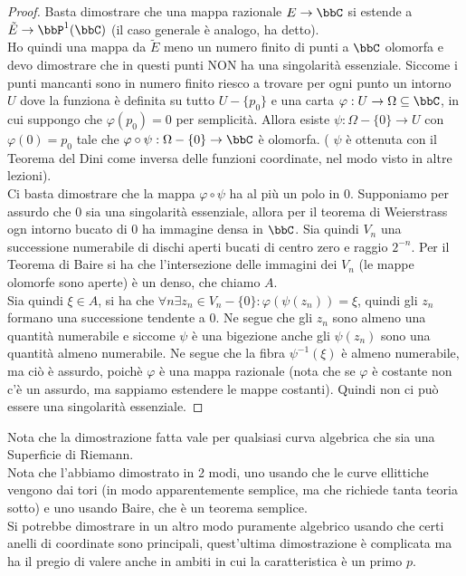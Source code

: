 \begin{proof}
Basta dimostrare che una mappa razionale $E\rightarrow \bbC$ si estende a $\tilde{E}\rightarrow\bbP^1(\bbC)$ (il caso generale è analogo, ha detto).\\
Ho quindi una mappa da $\tilde{E}$ meno un numero finito di punti a $\bbC$ olomorfa e devo dimostrare che in questi punti NON ha una singolarità essenziale. Siccome i punti mancanti sono in numero finito riesco a trovare per ogni punto un intorno $U$ dove la funziona è definita su tutto $U-\{ p_0\}$ e una carta $\varphi:U\rightarrow \Omega\subseteq\bbC$, in cui suppongo che $\varphi(p_0)=0$ per semplicità. Allora esiste $\psi:\Omega-\{ 0\}\rightarrow U$ con $\varphi(0)=p_0$ tale che $\varphi\circ\psi:\Omega-\{ 0\}\rightarrow \bbC$ è olomorfa. ( $\psi$ è ottenuta con il Teorema del Dini come inversa delle funzioni coordinate, nel modo visto in altre lezioni).\\
Ci basta dimostrare che la mappa $\varphi\circ\psi$ ha al più un polo in $0$.
Supponiamo per assurdo che $0$ sia una singolarità essenziale, allora per il teorema di Weierstrass ogn intorno bucato di $0$ ha immagine densa in $\bbC$. Sia quindi $V_n$ una successione numerabile di dischi aperti bucati di centro zero e raggio $2^{-n}$. Per il Teorema di Baire si ha che l'intersezione delle immagini dei $V_n$ (le mappe olomorfe sono aperte) è un denso, che chiamo $A$.\\
Sia quindi $\xi\in A$, si ha che $\forall n \exists z_n\in V_n - \{ 0 \} : \varphi ( \psi(z_n ))=\xi$, quindi gli $z_n$ formano una successione tendente a $0$. Ne segue che gli $z_n$ sono almeno una quantità numerabile e siccome $\psi$ è una bigezione anche gli $\psi(z_n)$ sono una quantità almeno numerabile. Ne segue che la fibra $\psi^{-1} (\xi )$ è almeno numerabile, ma ciò è assurdo, poichè $\varphi$ è una mappa razionale (nota che se $\varphi$ è costante non c'è un assurdo, ma sappiamo estendere le mappe costanti). Quindi non ci può essere una singolarità essenziale.
\end{proof}


\begin{osservazione}
Nota che la dimostrazione fatta vale per qualsiasi curva algebrica che sia una Superficie di Riemann.\\
Nota che l'abbiamo dimostrato in 2 modi, uno usando che le curve ellittiche vengono dai tori (in modo apparentemente semplice, ma che richiede tanta teoria sotto) e uno usando Baire, che è un teorema semplice.\\
Si potrebbe dimostrare in un altro modo puramente algebrico usando che certi anelli di coordinate sono principali, quest'ultima dimostrazione è complicata ma ha il pregio di valere anche in ambiti in cui la caratteristica è un primo $p$.
\end{osservazione}

